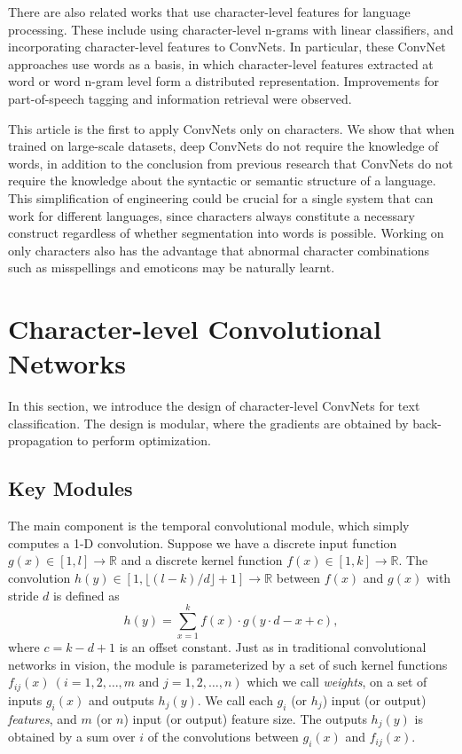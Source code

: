 \documentclass{article} %
\begin{document}
There are also related works that use character-level features for language processing. These include using character-level n-grams with linear classifiers\cite{KKHS07}, and incorporating character-level features to ConvNets\cite{SZ14}\cite{SHGDM14}. In particular, these ConvNet approaches use words as a basis, in which character-level features extracted at word\cite{SZ14} or word n-gram\cite{SHGDM14} level form a distributed representation. Improvements for part-of-speech tagging and information retrieval were observed.

This article is the first to apply ConvNets only on characters. We show that when trained on large-scale datasets, deep ConvNets do not require the knowledge of words, in addition to the conclusion from previous research that ConvNets do not require the knowledge about the syntactic or semantic structure of a language. This simplification of engineering could be crucial for a single system that can work for different languages, since characters always constitute a necessary construct regardless of whether segmentation into words is possible. Working on only characters also has the advantage that abnormal character combinations such as misspellings and emoticons may be naturally learnt.

\section{Character-level Convolutional Networks}

In this section, we introduce the design of character-level ConvNets for text classification. The design is modular, where the gradients are obtained by back-propagation\cite{RHW86} to perform optimization.

\subsection{Key Modules}

The main component is the temporal convolutional module, which simply computes a 1-D convolution. Suppose we have a discrete input function \(g(x) \in [1,l] \rightarrow \mathbb{R}\) and a discrete kernel function \(f(x) \in [1, k] \rightarrow \mathbb{R}\). The convolution \(h(y) \in [1,\lfloor (l-k)/d \rfloor + 1] \rightarrow \mathbb{R}\)  between \(f(x)\) and \(g(x)\) with stride \(d\) is defined as
\[
h(y) = \sum_{x = 1}^{k} f(x) \cdot g(y \cdot d - x + c),
\]
where \(c = k - d + 1\) is an offset constant. Just as in traditional convolutional networks in vision, the module is parameterized by a set of such kernel functions \(f_{ij} (x) ~ (i = 1, 2, \dots, m \text{ and } j = 1, 2, \dots, n )\) which we call \textit{weights}, on a set of inputs \(g_i(x) \) and outputs \(h_j(y)\). We call each \(g_i\) (or \(h_j\)) input (or output) \textit{features}, and \(m\) (or \(n\)) input (or output) feature size. The outputs \(h_j(y)\) is obtained by a sum over \(i\) of the convolutions between \(g_i(x)\) and \(f_{ij}(x)\).
\end{document}
